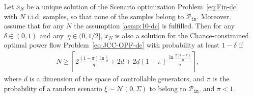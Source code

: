 \begin{theorem}\label{thm:40-dc}
Let $\bar x_N$ be a unique solution of the Scenario optimization Problem~\eqref{eq:Fin-dc} with $N$ i.i.d. samples, so that none of the samples belong to $\mathcal{P}_{\texttt{in}}$. Moreover, assume that for any $N$ the assumption \ref{asmp:10-dc} is fulfilled. Then for any $\delta \in (0,1)$ and any~$\eta \in (0, 1/2]$, $\bar x_N$ is also a solution for the Chance-constrained optimal power flow Problem~\eqref{eq:JCC-OPF-dc} with probability at least $1-\delta$ if 
\begin{align*}
  N \ge \left\lceil 2\frac{(1-\pi)\ln \frac{1}{\delta}}{\eta} + 2d + 2d (1-\pi) \frac{\ln\frac{2(1-\pi)}{\eta}}{\eta} \right\rceil, 
\end{align*} 
where $d$ is a dimension of the space of controllable generators, and $\pi$ is the probability of a random scenario $\xi\sim \mathcal{N}(0, \Sigma)$ to belong to $\mathcal{P}_{\texttt{in}}$, and $\pi < 1$. 
\end{theorem}
